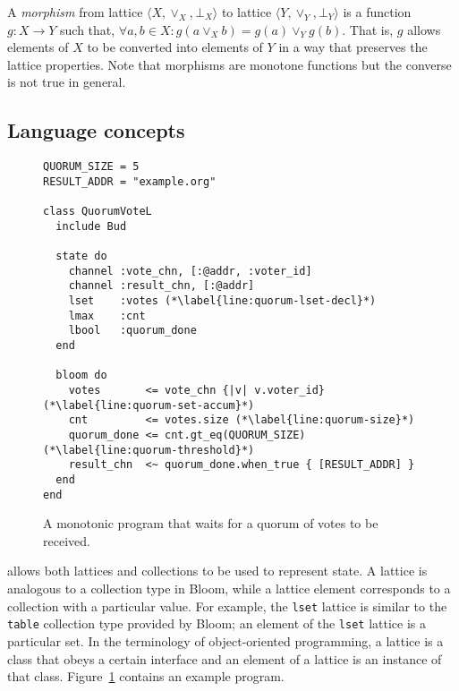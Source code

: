 A \emph{morphism} from lattice $\langle X, \lor_X, \bot_X\rangle$ to lattice
$\langle Y, \lor_Y, \bot_Y\rangle$ is a function $g: X \to Y$ such that,
$\forall a,b \in X: g(a \lor_X b) = g(a) \lor_Y g(b)$. That is, $g$ allows
elements of $X$ to be converted into elements of $Y$ in a way that preserves the
lattice properties.  Note that morphisms are monotone functions but the converse
is not true in general.

\subsection{Language concepts}
\begin{figure}[t]
\begin{scriptsize}
\begin{lstlisting}
QUORUM_SIZE = 5
RESULT_ADDR = "example.org"

class QuorumVoteL
  include Bud

  state do
    channel :vote_chn, [:@addr, :voter_id]
    channel :result_chn, [:@addr]
    lset    :votes (*\label{line:quorum-lset-decl}*)
    lmax    :cnt
    lbool   :quorum_done
  end

  bloom do
    votes       <= vote_chn {|v| v.voter_id} (*\label{line:quorum-set-accum}*)
    cnt         <= votes.size (*\label{line:quorum-size}*)
    quorum_done <= cnt.gt_eq(QUORUM_SIZE) (*\label{line:quorum-threshold}*)
    result_chn  <~ quorum_done.when_true { [RESULT_ADDR] }
  end
end
\end{lstlisting}
\end{scriptsize}
\caption{A monotonic \lang program that waits for a quorum of votes to be received.}
\label{fig:lattice-quorum}
\end{figure}

\lang allows both lattices and collections to be used to represent state. A
lattice is analogous to a collection type in Bloom, while a lattice element
corresponds to a collection with a particular value. For example, the
\texttt{lset} lattice is similar to the \texttt{table} collection type provided
by Bloom; an element of the \texttt{lset} lattice is a particular set. In the
terminology of object-oriented programming, a lattice is a class that obeys a
certain interface and an element of a lattice is an instance of that
class. Figure~\ref{fig:lattice-quorum} contains an example \lang program.

